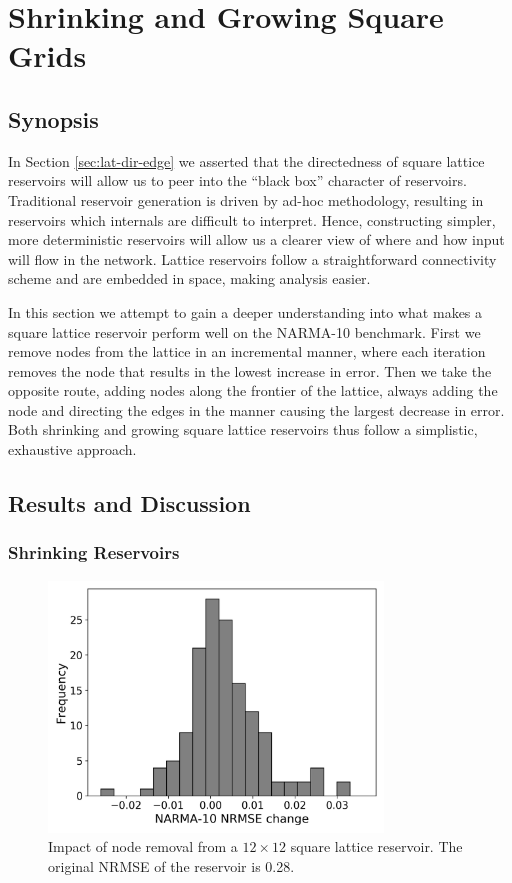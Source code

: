 \section{Shrinking and Growing Square Grids}
\label{sec:shrink-grow}

\subsection{Synopsis}

In Section \ref{sec:lat-dir-edge} we asserted that the directedness of square
lattice reservoirs will allow us to peer into the ``black box'' character of
reservoirs. Traditional reservoir generation is driven by ad-hoc methodology,
resulting in reservoirs which internals are difficult to interpret. Hence,
constructing simpler, more deterministic reservoirs will allow us a clearer view
of where and how input will flow in the network. Lattice reservoirs follow a
straightforward connectivity scheme and are embedded in space, making analysis
easier.

In this section we attempt to gain a deeper understanding into what makes a
square lattice reservoir perform well on the NARMA-10 benchmark. First we remove
nodes from the lattice in an incremental manner, where each iteration removes
the node that results in the lowest increase in error. Then we take the opposite
route, adding nodes along the frontier of the lattice, always adding the node
and directing the edges in the manner causing the largest decrease in
error. Both shrinking and growing square lattice reservoirs thus follow a
simplistic, exhaustive approach.

\subsection{Results and Discussion}

\subsubsection{Shrinking Reservoirs}

\begin{figure}[htb]
  \centering
  \includegraphics[width=3.5in]{figures/removal-hist.png}
  \caption{
    Impact of node removal from a $12 \times 12$ square lattice reservoir. The
original NRMSE of the reservoir is 0.28.
  }
  \label{fig:rt-removal-hist}
\end{figure}

